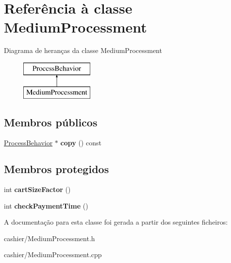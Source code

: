 \hypertarget{classMediumProcessment}{\section{Referência à classe Medium\-Processment}
\label{dc/dca/classMediumProcessment}
}
Diagrama de heranças da classe Medium\-Processment\begin{figure}[H]
\begin{center}
\leavevmode
\includegraphics[height=2.000000cm]{dc/dca/classMediumProcessment}
\end{center}
\end{figure}
\subsection*{Membros públicos}
\begin{DoxyCompactItemize}
\item 
\hypertarget{classMediumProcessment_a8207750eb9bf65f830770b3631845934}{\hyperlink{classProcessBehavior}{Process\-Behavior} $\ast$ {\bfseries copy} () const }\label{dc/dca/classMediumProcessment_a8207750eb9bf65f830770b3631845934}

\end{DoxyCompactItemize}
\subsection*{Membros protegidos}
\begin{DoxyCompactItemize}
\item 
\hypertarget{classMediumProcessment_a8baac43e0224353f4c5340c5e7117b62}{int {\bfseries cart\-Size\-Factor} ()}\label{dc/dca/classMediumProcessment_a8baac43e0224353f4c5340c5e7117b62}

\item 
\hypertarget{classMediumProcessment_ab14abd8ec6b6a7af6aa2879c471dded7}{int {\bfseries check\-Payment\-Time} ()}\label{dc/dca/classMediumProcessment_ab14abd8ec6b6a7af6aa2879c471dded7}

\end{DoxyCompactItemize}


A documentação para esta classe foi gerada a partir dos seguintes ficheiros\-:\begin{DoxyCompactItemize}
\item 
cashier/Medium\-Processment.\-h\item 
cashier/Medium\-Processment.\-cpp\end{DoxyCompactItemize}
